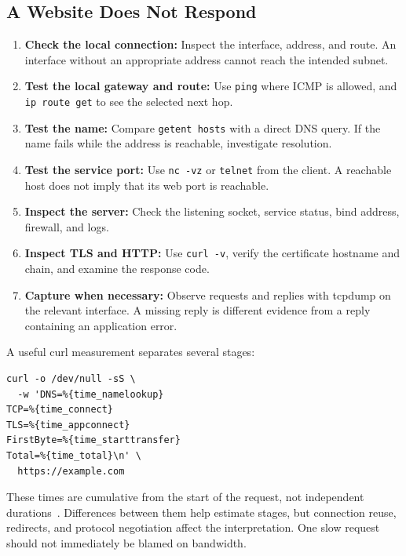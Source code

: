 \documentclass[journal]{IEEEtran}
\begin{document}
\subsection{A Website Does Not Respond}
\begin{enumerate}
    \item \textbf{Check the local connection:} Inspect the interface, address, and route. An interface without an appropriate address cannot reach the intended subnet.
    \item \textbf{Test the local gateway and route:} Use \texttt{ping} where ICMP is allowed, and \texttt{ip route get} to see the selected next hop.
    \item \textbf{Test the name:} Compare \texttt{getent hosts} with a direct DNS query. If the name fails while the address is reachable, investigate resolution.
    \item \textbf{Test the service port:} Use \texttt{nc -vz} or \texttt{telnet} from the client. A reachable host does not imply that its web port is reachable.
    \item \textbf{Inspect the server:} Check the listening socket, service status, bind address, firewall, and logs.
    \item \textbf{Inspect TLS and HTTP:} Use \texttt{curl -v}, verify the certificate hostname and chain, and examine the response code.
    \item \textbf{Capture when necessary:} Observe requests and replies with tcpdump on the relevant interface. A missing reply is different evidence from a reply containing an application error.
\end{enumerate}
A useful curl measurement separates several stages:
\begin{lstlisting}
curl -o /dev/null -sS \
  -w 'DNS=%{time_namelookup}
TCP=%{time_connect}
TLS=%{time_appconnect}
FirstByte=%{time_starttransfer}
Total=%{time_total}\n' \
  https://example.com
\end{lstlisting}
These times are cumulative from the start of the request, not independent durations~\cite{curl}. Differences between them help estimate stages, but connection reuse, redirects, and protocol negotiation affect the interpretation. One slow request should not immediately be blamed on bandwidth.
\end{document}
